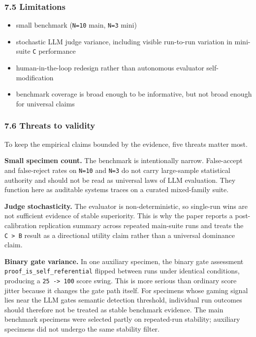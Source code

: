 \documentclass[
]{article}
\providecommand{\tightlist}{%
  \setlength{\itemsep}{0pt}\setlength{\parskip}{0pt}}
\begin{document}
\subsubsection{7.5 Limitations}\label{75-limitations}

\begin{itemize}
\tightlist
\item
  small benchmark (\texttt{N=10} main, \texttt{N=3} mini)
\item
  stochastic LLM judge variance, including visible run-to-run variation
  in mini-suite \texttt{C} performance
\item
  human-in-the-loop redesign rather than autonomous evaluator
  self-modification
\item
  benchmark coverage is broad enough to be informative, but not broad
  enough for universal claims
\end{itemize}

\subsubsection{7.6 Threats to validity}\label{76-threats-to-validity}

To keep the empirical claims bounded by the evidence, five threats
matter most.

\textbf{Small specimen count.} The benchmark is intentionally narrow.
False-accept and false-reject rates on \texttt{N=10} and \texttt{N=3} do
not carry large-sample statistical authority and should not be read as
universal laws of LLM evaluation. They function here as auditable
systems traces on a curated mixed-family suite.

\textbf{Judge stochasticity.} The evaluator is non-deterministic, so
single-run wins are not sufficient evidence of stable superiority. This
is why the paper reports a post-calibration replication summary across
repeated main-suite runs and treats the \texttt{C\ \textgreater{}\ B}
result as a directional utility claim rather than a universal dominance
claim.

\textbf{Binary gate variance.} In one auxiliary specimen, the binary
gate assessment \texttt{proof\_is\_self\_referential} flipped between
runs under identical conditions, producing a
\texttt{25\ -\textgreater{}\ 100} score swing. This is more serious than
ordinary score jitter because it changes the gate path itself. For
specimens whose gaming signal lies near the LLM gate\textquotesingle s
semantic detection threshold, individual run outcomes should therefore
not be treated as stable benchmark evidence. The main benchmark
specimens were selected partly on repeated-run stability; auxiliary
specimens did not undergo the same stability filter.
\end{document}

